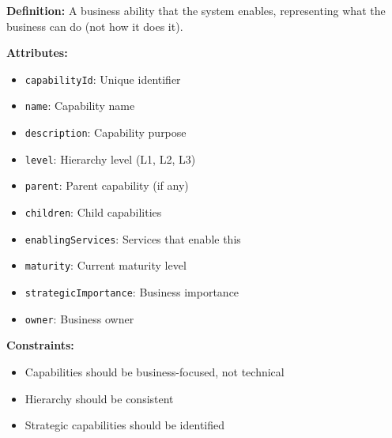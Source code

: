 \documentclass[11pt,letterpaper]{article}
\begin{document}
\begin{definitionbox}
\textbf{Definition:} A business ability that the system enables, representing what the business can do (not how it does it).

\textbf{Attributes:}
\begin{itemize}[nosep]
    \item \texttt{capabilityId}: Unique identifier
    \item \texttt{name}: Capability name
    \item \texttt{description}: Capability purpose
    \item \texttt{level}: Hierarchy level (L1, L2, L3)
    \item \texttt{parent}: Parent capability (if any)
    \item \texttt{children}: Child capabilities
    \item \texttt{enablingServices}: Services that enable this
    \item \texttt{maturity}: Current maturity level
    \item \texttt{strategicImportance}: Business importance
    \item \texttt{owner}: Business owner
\end{itemize}

\textbf{Constraints:}
\begin{itemize}[nosep]
    \item Capabilities should be business-focused, not technical
    \item Hierarchy should be consistent
    \item Strategic capabilities should be identified
\end{itemize}
\end{definitionbox}
\end{document}
